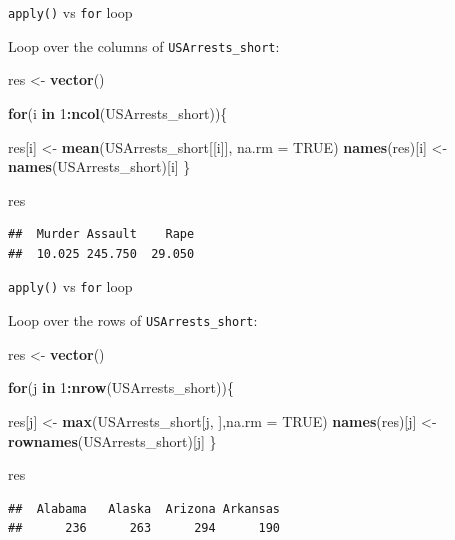 \documentclass[ignorenonframetext,]{beamer}
\newenvironment{Shaded}{\begin{snugshade}}{\end{snugshade}}
\newcommand{\ControlFlowTok}[1]{\textcolor[rgb]{0.13,0.29,0.53}{\textbf{#1}}}
\newcommand{\DataTypeTok}[1]{\textcolor[rgb]{0.13,0.29,0.53}{#1}}
\newcommand{\DecValTok}[1]{\textcolor[rgb]{0.00,0.00,0.81}{#1}}
\newcommand{\KeywordTok}[1]{\textcolor[rgb]{0.13,0.29,0.53}{\textbf{#1}}}
\newcommand{\NormalTok}[1]{#1}
\newcommand{\OperatorTok}[1]{\textcolor[rgb]{0.81,0.36,0.00}{\textbf{#1}}}
\newcommand{\OtherTok}[1]{\textcolor[rgb]{0.56,0.35,0.01}{#1}}
\newcommand{\StringTok}[1]{\textcolor[rgb]{0.31,0.60,0.02}{#1}}
\begin{document}
\begin{frame}[fragile]{\texttt{apply()} vs \texttt{for} loop}
\protect\hypertarget{apply-vs-for-loop}{}

Loop over the columns of \texttt{USArrests\_short}:

\begin{Shaded}
\begin{Highlighting}[]
\NormalTok{res <-}\StringTok{ }\KeywordTok{vector}\NormalTok{()}

\ControlFlowTok{for}\NormalTok{(i }\ControlFlowTok{in} \DecValTok{1}\OperatorTok{:}\KeywordTok{ncol}\NormalTok{(USArrests_short))\{}
  
\NormalTok{  res[i] <-}\StringTok{ }\KeywordTok{mean}\NormalTok{(USArrests_short[[i]], }\DataTypeTok{na.rm =} \OtherTok{TRUE}\NormalTok{)}
  \KeywordTok{names}\NormalTok{(res)[i] <-}\StringTok{ }\KeywordTok{names}\NormalTok{(USArrests_short)[i]}
\NormalTok{\}}

\NormalTok{res}
\end{Highlighting}
\end{Shaded}

\begin{verbatim}
##  Murder Assault    Rape 
##  10.025 245.750  29.050
\end{verbatim}

\end{frame}

\begin{frame}[fragile]{\texttt{apply()} vs \texttt{for} loop}
\protect\hypertarget{apply-vs-for-loop-1}{}

Loop over the rows of \texttt{USArrests\_short}:

\begin{Shaded}
\begin{Highlighting}[]
\NormalTok{res <-}\StringTok{ }\KeywordTok{vector}\NormalTok{()}

\ControlFlowTok{for}\NormalTok{(j }\ControlFlowTok{in} \DecValTok{1}\OperatorTok{:}\KeywordTok{nrow}\NormalTok{(USArrests_short))\{}
  
\NormalTok{  res[j] <-}\StringTok{ }\KeywordTok{max}\NormalTok{(USArrests_short[j, ],}\DataTypeTok{na.rm =} \OtherTok{TRUE}\NormalTok{)}
  \KeywordTok{names}\NormalTok{(res)[j] <-}\StringTok{ }\KeywordTok{rownames}\NormalTok{(USArrests_short)[j]}
\NormalTok{\}}

\NormalTok{res}
\end{Highlighting}
\end{Shaded}

\begin{verbatim}
##  Alabama   Alaska  Arizona Arkansas 
##      236      263      294      190
\end{verbatim}

\end{frame}
\end{document}
